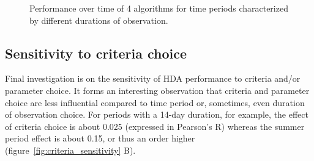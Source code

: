\documentclass[a4paper]{article}
\begin{document}
\begin{figure}[htpb!]
\centering
\caption{Performance over time of 4 algorithms for time periods characterized by different durations of observation.}
\label{fig:duration_sensitivity}
\end{figure}

\subsection{Sensitivity to criteria choice}

Final investigation is on the sensitivity of HDA performance to criteria and/or parameter choice. It forms an interesting observation that criteria and parameter choice are less influential compared to time period or, sometimes, even duration of observation choice. 
For periods with a 14-day duration, for example, the effect of criteria choice is about 0.025 (expressed in Pearson's R) whereas the summer period effect is about 0.15, or thus an order higher (figure~\ref{fig:criteria_sensitivity} B). 
\end{document}
